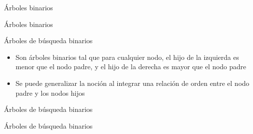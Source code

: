 \documentclass[]{beamer}
\begin{document}
\begin{frame}{\'Arboles binarios}
  
\end{frame}

\begin{frame}{\'Arboles binarios}
  
\end{frame}

\begin{frame}{\'Arboles de b\'usqueda binarios}
  \begin{itemize}
    \item Son \'arboles binarios tal que para cualquier nodo, el hijo de la izquierda es menor que el nodo padre, y el hijo de la derecha es mayor que el nodo padre
      \pause
    \item Se puede generalizar la noci\'on al integrar una relaci\'on de orden entre el nodo padre y los nodos hijos
  \end{itemize}
\end{frame}

\begin{frame}{\'Arboles de b\'usqueda binarios}
\end{frame}

\begin{frame}{\'Arboles de b\'usqueda binarios}
  
\end{frame}
\end{document}
